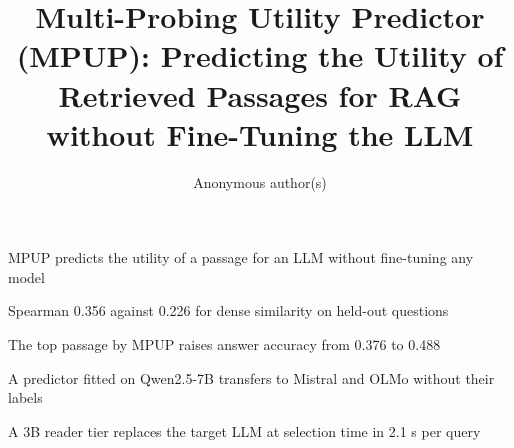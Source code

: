 \documentclass[preprint,12pt,authoryear]{elsarticle}
\begin{document}
\begin{frontmatter}

\title{Multi-Probing Utility Predictor (MPUP): Predicting the Utility of Retrieved Passages for RAG without Fine-Tuning the LLM}

\author{Anonymous author(s)}

\begin{highlights}
\item MPUP predicts the utility of a passage for an LLM without fine-tuning any model
\item Spearman 0.356 against 0.226 for dense similarity on held-out questions
\item The top passage by MPUP raises answer accuracy from 0.376 to 0.488
\item A predictor fitted on Qwen2.5-7B transfers to Mistral and OLMo without their labels
\item A 3B reader tier replaces the target LLM at selection time in 2.1 s per query
\end{highlights}


\end{frontmatter}
\end{document}
